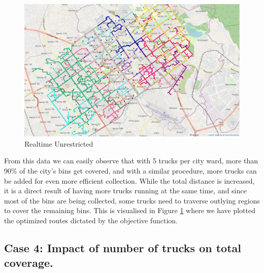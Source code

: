 \documentclass[12pt]{article}
\begin{document}
\begin{figure}[H]
    \centering
    \includegraphics[scale=0.4]{Dynamic5trucks.png}
    \caption{Realtime Unrestricted}\label{fig2}
\end{figure}

From this data we can easily observe that with 5 trucks per city ward, more than 90\% of the city's bins get covered, and with a similar procedure, more trucks can be added for even more efficient collection. While the total distance is increased, it is a direct result of having more trucks running at the same time, and since most of the bins are being collected, some trucks need to traverse outlying regions to cover the remaining bins. This is visualised in Figure \ref{fig2} where we have plotted the optimized routes dictated by the objective function.

\subsection*{Case 4: Impact of number of trucks on total coverage.}
\end{document}
